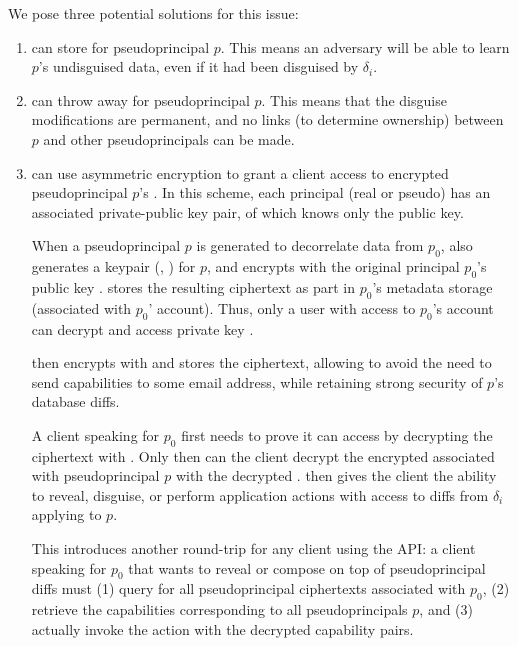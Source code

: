 We pose three potential solutions for this issue:
\begin{enumerate}
    \item \sys can store  for pseudoprincipal $p$. This means
        an adversary will be able to learn $p$'s undisguised data, even if it had been disguised by
        $\delta_i$.

    \item \sys can throw away  for pseudoprincipal $p$. This means that the
        disguise modifications are permanent, and no links (to determine ownership) between
        $p$ and other pseudoprincipals can be made.

    \item \sys can use asymmetric encryption to grant a client access to encrypted pseudoprincipal
        $p$'s . In this scheme, each principal (real or pseudo) has an associated private-public
        key pair, of which \sys knows only the public key. 

        When a pseudoprincipal $p$ is generated to decorrelate data from $p_0$, \sys also generates a
        keypair (, ) for $p$, and encrypts  with the original principal
        $p_0$'s public key . \sys stores the
        resulting ciphertext as part in $p_0$'s metadata storage (\eg associated with $p_0$' account).
        Thus, only a user with access to $p_0$'s account can decrypt and access private key .

        \sys then encrypts  with  and stores the ciphertext, allowing \sys
        to avoid the need to send capabilities to some email address, while retaining strong
        security of $p$'s database diffs.

        A client speaking for $p_0$ first needs to prove it can access  by decrypting the
         ciphertext with .  Only then can the client decrypt the encrypted
         associated with pseudoprincipal $p$ with the decrypted .
         then gives the client the ability to reveal, disguise, or perform
        application actions with access to diffs from $\delta_i$ applying to $p$.

        This introduces another round-trip for any client using the API: a client speaking
        for $p_0$ that wants to reveal or compose on top of pseudoprincipal diffs must (1) query for
        all pseudoprincipal  ciphertexts associated with $p_0$, (2) retrieve the capabilities
        corresponding to all pseudoprincipals $p$, and (3) actually invoke the action with the
        decrypted capability pairs.
\end{enumerate}

